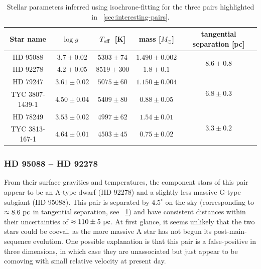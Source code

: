 \documentclass[modern, letterpaper]{aastex61}
\newcommand{\logg}{\ensuremath{\ensuremath{\log g}}}
\newcommand{\teff}{\ensuremath{\ensuremath{T_{\rm eff}}}}
\begin{document}
\begin{table}[ht]
  \begin{center}
    \begin{tabular}{ c | c | c | c | c }
      \toprule
        Star name & \logg\ & \teff\ [K] & mass [$M_\odot$] &
          tangential separation [pc]  \\
        \toprule
        HD 95088 & $3.7 \pm 0.02$ & $5303 \pm 74$ & $1.490 \pm 0.002$ &
          \multirow{2}{*}{$8.6 \pm 0.8$}\\
        HD 92278 & $4.2 \pm 0.05$ & $8519 \pm 300$ & $1.8 \pm 0.1$ &\\
        \midrule
        HD 79247 & $3.61 \pm 0.02$ & $5075 \pm 60$ & $1.150 \pm 0.004$ &
          \multirow{2}{*}{$6.8 \pm 0.3$}\\
        TYC 3807-1439-1 & $4.50 \pm 0.04$ & $5409 \pm 80$ & $0.88 \pm 0.05$ &\\
        \midrule
        HD 78249 & $3.53 \pm 0.02$ & $4997 \pm 62$ & $1.54 \pm 0.01$ &
          \multirow{2}{*}{$3.3 \pm 0.2$}\\
        TYC 3813-167-1 & $4.64 \pm 0.01$ & $4503 \pm 45$ & $0.75 \pm 0.02$ &\\
      \bottomrule
    \end{tabular}
    \caption{
      Stellar parameters inferred using isochrone-fitting for the three pairs
      highlighted in \sectionname~\ref{sec:interesting-pairs}.
      \label{tbl:highlighted-pairs}
    }
  \end{center}
\end{table}

\subsubsection{HD 95088 -- HD 92278}

From their surface gravities and temperatures, the component stars of this pair
appear to be an A-type dwarf (HD 92278) and a slightly less massive G-type
subgiant (HD 95088).
This pair is separated by $4.5^\circ$ on the sky (corresponding to $\approx
8.6~\mathrm{pc}$ in tangential separation, see \tablename~\ref{tbl:highlighted-pairs})
and have consistent distances within their uncertainties of $\approx 110 \pm
5~\mathrm{pc}$.
At first glance, it seems unlikely that the two stars could be coeval, as the
more massive A star has not begun its post-main-sequence evolution.
One possible explanation is that this pair is a false-positive in three
dimensions, in which case they are unassociated but just appear to be comoving
with small relative velocity at present day.
\end{document}
